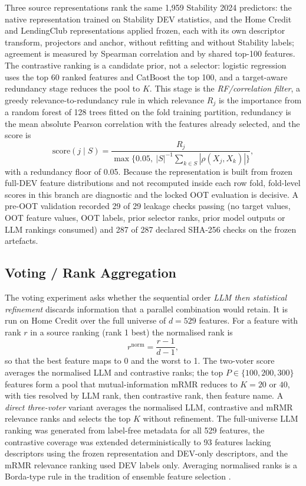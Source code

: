 \documentclass[final,5p,twocolumn]{elsarticle}
\newcommand{\Kfeat}{K}
\begin{document}
Three source representations rank the same 1,959 Stability 2024 predictors: the native representation trained on Stability DEV statistics, and the Home Credit and LendingClub representations applied frozen, each with its own descriptor transform, projectors and anchor, without refitting and without Stability labels; agreement is measured by Spearman correlation \cite{spearman1904} and by shared top-100 features. The contrastive ranking is a candidate prior, not a selector: logistic regression uses the top 60 ranked features and CatBoost the top 100, and a target-aware redundancy stage reduces the pool to $\Kfeat$. This stage is the \emph{RF/correlation filter}, a greedy relevance-to-redundancy rule in which relevance $R_j$ is the importance from a random forest of 128 trees fitted on the fold training partition, redundancy is the mean absolute Pearson correlation with the features already selected, and the score is
\begin{equation}
    \mathrm{score}(j\mid S)=\frac{R_j}{\max\{0.05,\ |S|^{-1}\sum_{k\in S}|\rho(X_j,X_k)|\}} ,
    \label{eq:legacy_mrmr}
\end{equation}
with a redundancy floor of 0.05. Because the representation is built from frozen full-DEV feature distributions and not recomputed inside each row fold, fold-level scores in this branch are diagnostic and the locked OOT evaluation is decisive. A pre-OOT validation recorded 29 of 29 leakage checks passing (no target values, OOT feature values, OOT labels, prior selector ranks, prior model outputs or LLM rankings consumed) and 287 of 287 declared SHA-256 checks on the frozen artefacts.

\subsection{Voting / Rank Aggregation}
\label{subsec:voting_fs}

The voting experiment asks whether the sequential order \emph{LLM then statistical refinement} discards information that a parallel combination would retain. It is run on Home Credit over the full universe of $d=529$ features. For a feature with rank $r$ in a source ranking (rank 1 best) the normalised rank is
\begin{equation}
    r^{\mathrm{norm}}=\frac{r-1}{d-1},
    \label{eq:normrank}
\end{equation}
so that the best feature maps to 0 and the worst to 1. The two-voter score averages the normalised LLM and contrastive ranks; the top $P\in\{100,200,300\}$ features form a pool that mutual-information mRMR reduces to $\Kfeat=20$ or $40$, with ties resolved by LLM rank, then contrastive rank, then feature name. A \emph{direct three-voter} variant averages the normalised LLM, contrastive and mRMR relevance ranks and selects the top $\Kfeat$ without refinement. The full-universe LLM ranking was generated from label-free metadata for all 529 features, the contrastive coverage was extended deterministically to 93 features lacking descriptors using the frozen representation and DEV-only descriptors, and the mRMR relevance ranking used DEV labels only. Averaging normalised ranks is a Borda-type rule \cite{dwork2001} in the tradition of ensemble feature selection \cite{saeys2008}.
\end{document}
